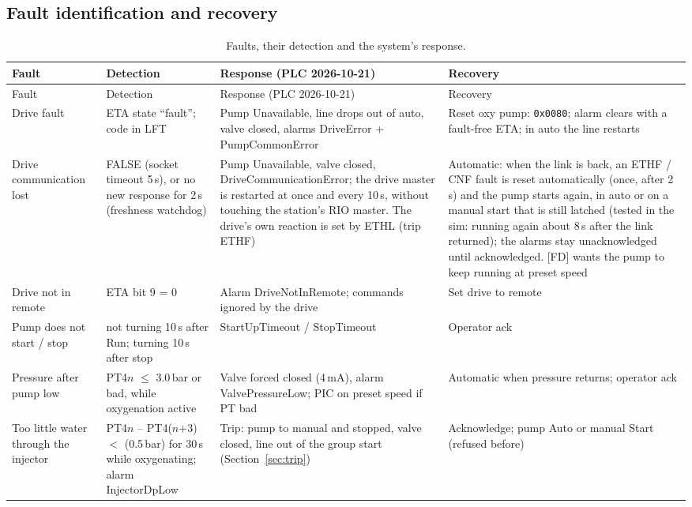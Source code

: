 \documentclass[11pt,a4paper]{article}
\begin{document}
\subsection{Fault identification and recovery}
\begin{small}
\begin{longtable}{@{}P{34mm}P{40mm}P{48mm}P{30mm}@{}}
\caption{Faults, their detection and the system's response.}\label{tab:faults}\\
\toprule
Fault & Detection & Response (PLC 2026-10-21) & Recovery \\
\midrule
\endfirsthead
\toprule
Fault & Detection & Response (PLC 2026-10-21) & Recovery \\
\midrule
\endhead
\bottomrule
\endfoot
Drive fault & ETA state ``fault''; code in LFT & Pump Unavailable, line drops out of auto, valve closed, alarms DriveError + PumpCommonError & Reset oxy pump: \texttt{0x0080}; alarm clears with a fault-free ETA; in auto the line restarts \\
Drive communication lost &  FALSE (socket timeout 5\,s), or no new response for 2\,s (freshness watchdog) & Pump Unavailable, valve closed, DriveCommunicationError; the drive master is restarted at once and every 10\,s, without touching the station's RIO master. The drive's own reaction is set by ETHL (trip ETHF) & Automatic: when the link is back, an ETHF / CNF fault is reset automatically (once, after 2\,s) and the pump starts again, in auto or on a manual start that is still latched (tested in the sim: running again about 8\,s after the link returned); the alarms stay unacknowledged until acknowledged. [FD] wants the pump to keep running at preset speed \\
Drive not in remote & ETA bit 9 = 0 & Alarm DriveNotInRemote; commands ignored by the drive & Set drive to remote \\
Pump does not start / stop & not turning 10\,s after Run; turning 10\,s after stop & StartUpTimeout / StopTimeout & Operator ack \\
Pressure after pump low & PT4$n$ $\leq$ 3.0\,bar or bad, while oxygenation active & Valve forced closed (4\,mA), alarm ValvePressureLow; PIC on preset speed if PT bad & Automatic when pressure returns; operator ack \\
Too little water through the injector & PT4$n$ -- PT4($n$+3) $<$  (0.5\,bar) for 30\,s while oxygenating; alarm InjectorDpLow & Trip: pump to manual and stopped, valve closed, line out of the group start (Section~\ref{sec:trip}) & Acknowledge; pump Auto or manual Start (refused before) \\

\end{longtable}
\end{small}
\end{document}
